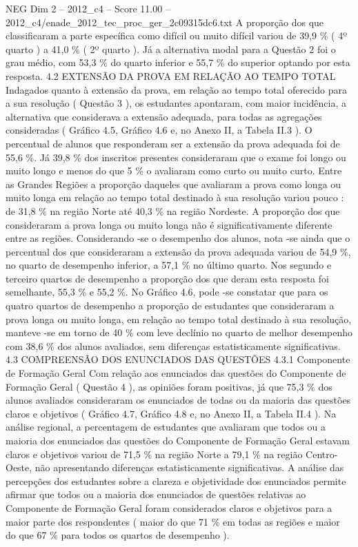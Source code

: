 \begin{textsample}{NEG Dim 2 – 2012\_c4 – Score 11.00 – 2012\_c4/enade\_2012\_tec\_proc\_ger\_2c09315dc6.txt}
A proporção dos que classificaram a parte específica como difícil ou muito difícil variou de 39,9 \% ( 4º quarto ) a 41,0 \% ( 2º quarto ).
Já a alternativa modal para a Questão 2 foi o grau médio, com 53,3 \% do quarto inferior e 55,7 \% do superior optando por esta resposta. 4.2 EXTENSÃO DA PROVA EM RELAÇÃO AO TEMPO TOTAL Indagados quanto à extensão da prova, em relação ao tempo total oferecido para a sua resolução ( Questão 3 ), os estudantes apontaram, com maior incidência, a alternativa que considerava a extensão adequada, para todas as agregações consideradas ( Gráfico 4.5, Gráfico 4.6 e, no Anexo II, a Tabela II.3 ).
O percentual de alunos que responderam ser a extensão da prova adequada foi de 55,6 \%.
Já 39,8 \% dos inscritos presentes consideraram que o exame foi longo ou muito longo e menos do que 5 \% o avaliaram como curto ou muito curto.
Entre as Grandes Regiões a proporção daqueles que avaliaram a prova como longa ou muito longa em relação ao tempo total destinado à sua resolução variou pouco : de 31,8 \% na região Norte até 40,3 \% na região Nordeste.
A proporção dos que consideraram a prova longa ou muito longa não é significativamente diferente entre as regiões.
Considerando -se o desempenho dos alunos, nota -se ainda que o percentual dos que consideraram a extensão da prova adequada variou de 54,9 \%, no quarto de desempenho inferior, a 57,1 \% no último quarto.
Nos segundo e terceiro quartos de desempenho a proporção dos que deram esta resposta foi semelhante, 55,3 \% e 55,2 \%.
No Gráfico 4.6, pode -se constatar que para os quatro quartos de desempenho a proporção de estudantes que consideraram a prova longa ou muito longa, em relação ao tempo total destinado à sua resolução, manteve -se em torno de 40 \% com leve declínio no quarto de melhor desempenho com 38,6 \% dos alunos avaliados, sem diferenças estatisticamente significativas. 4.3 COMPREENSÃO DOS ENUNCIADOS DAS QUESTÕES 4.3.1 Componente de Formação Geral Com relação aos enunciados das questões do Componente de Formação Geral ( Questão 4 ), as opiniões foram positivas, já que 75,3 \% dos alunos avaliados consideraram os enunciados de todas ou da maioria das questões claros e objetivos ( Gráfico 4.7, Gráfico 4.8 e, no Anexo II, a Tabela II.4 ).
Na análise regional, a percentagem de estudantes que avaliaram que todos ou a maioria dos enunciados das questões do Componente de Formação Geral estavam claros e objetivos variou de 71,5 \% na região Norte a 79,1 \% na região Centro-Oeste, não apresentando diferenças estatisticamente significativas.
A análise das percepções dos estudantes sobre a clareza e objetividade dos enunciados permite afirmar que todos ou a maioria dos enunciados de questões relativas ao Componente de Formação Geral foram considerados claros e objetivos para a maior parte dos respondentes ( maior do que 71 \% em todas as regiões e maior do que 67 \% para todos os quartos de desempenho ).

\end{textsample}
